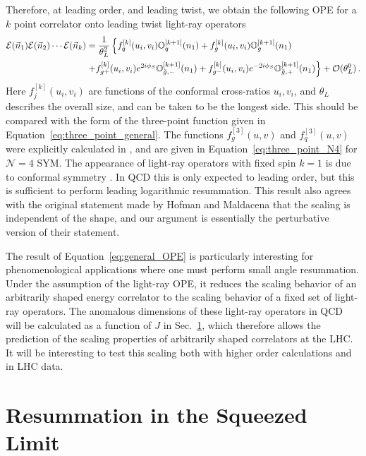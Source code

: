 \documentclass[letterpaper,11pt]{article}
\def\cN{\mathcal{N}}
\def\nn{{\nonumber}}
\newcommand{\Eq}[1]{Equation~\eqref{#1}}
\DeclareRobustCommand{\Sec}[1]{Sec.~\ref{#1}}
\DeclareRobustCommand{\Eq}[1]{Eq.~(\ref{#1})}
\begin{document}
Therefore, at leading order, and leading twist, we obtain the following OPE for a $k$ point correlator onto leading twist light-ray operators
\begin{align} \label{eq:general_OPE}
\mathcal{E}(\vec{n}_1)\mathcal{E}(\vec{n}_2)\cdots  \mathcal{E}(\vec{n}_k)
&= \frac{1}{\theta_L^2} \left\{ f^{[k]}_q(u_i,v_i) \mathbb{O}_q^{[k+1]}(n_1)+ f^{[k]}_g(u_i,v_i) \mathbb{O}_g^{[k+1]}(n_1) \right.  \\
&\left. + f^{[k]}_{g+}(u_i,v_i)  e^{2i\phi_S} \mathbb{O}_{\tilde{g},-}^{[k+1]}(n_1) + f^{[k]}_{g-}(u_i,v_i)  e^{-2i\phi_S} \mathbb{O}_{\tilde{g},+}^{[k+1]}(n_1)
\right\}
+\mathcal{O}(\theta_L^0) \nn\,.
\end{align}
Here $f^{[k]}_j(u_i,v_i)$ are functions of the conformal cross-ratios $u_i,v_i$, and $\theta_L$ describes the overall size, and can be taken to be the longest side. This should be compared with the form of the three-point function given in \Eq{eq:three_point_general}. The functions $f^{[3]}_g(u,v)$ and $f^{[3]}_q(u,v)$ were explicitly calculated in \cite{Chen:2019bpb}, and are given in \Eq{eq:three_point_N4} for $\cN=4$ SYM. The appearance of light-ray operators with fixed spin $k=1$ is due to conformal symmetry \cite{Hofman:2008ar,Kologlu:2019mfz}. In QCD this is only expected to leading order, but this is sufficient to perform leading logarithmic resummation. This result also agrees with the original statement made by Hofman and Maldacena \cite{Hofman:2008ar}  that the scaling is independent of the shape, and our argument is essentially the perturbative version of their statement. 


The result of \Eq{eq:general_OPE} is particularly interesting for phenomenological applications where one must perform small angle resummation. Under the assumption of the light-ray OPE, it reduces the scaling behavior of an arbitrarily shaped energy correlator to the scaling behavior of a fixed set of light-ray operators. The anomalous dimensions of these light-ray operators in QCD will be calculated as a function of $J$ in \Sec{sec:resum}, which therefore allows the prediction of the scaling properties of arbitrarily shaped correlators at the LHC. It will be interesting to test this scaling both with higher order calculations and in LHC data.



\section{Resummation in the Squeezed Limit}\label{sec:resum}
\end{document}
